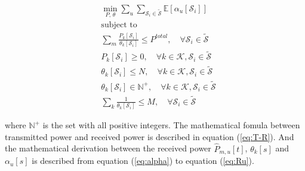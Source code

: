 
\begin{subequations} \label{eq:main}
\begin{align}
    &\min_{P,\,\theta} \sum_{u} \sum_{\mathcal{S}_i\in \mathcal{\widetilde{S}}} \mathbb{E}[\alpha_u[\mathcal{S}_i]] \\ 
    &\text{subject to} \nonumber \\
    &\sum_{m} \frac{P_{k}[\mathcal{S}_i]}{\theta_k[\mathcal{S}_i]} \leq P^{total}, \quad \forall \mathcal{S}_i \in \mathcal{\widetilde{S}} \label{eq:power_constraint} \\ 
    &P_k[\mathcal{S}_i]\geq 0, \quad \forall k\in\mathcal{K}, \mathcal{S}_i\in\mathcal{\widetilde{S}} \label{eq:power_nonnegative} \\
    &\theta_k[\mathcal{S}_i] \leq N, \quad \forall k\in\mathcal{K}, \mathcal{S}_i\in\mathcal{\widetilde{S}} \label{eq:theta_upper} \\
    &\theta_k[\mathcal{S}_i] \in \mathbb{N}^+, \quad \forall k\in\mathcal{K}, \mathcal{S}_i\in\mathcal{\widetilde{S}} \label{eq:theta_positive} \\
    &\sum_k \frac{1}{\theta_k[\mathcal{S}_i]} \leq M, \quad \forall \mathcal{S}_i\in\mathcal{\widetilde{S}} \label{eq:sum_constraint}
\end{align}
\end{subequations}

where $\mathbb{N}^+$ is the set with all positive integers. The mathematical fomula between transmitted power and received power is described in equation (\ref{eq:T-R}). And the mathematical derivation between the received power $\hat{P}_{m, u}[t]$, $\theta_k[s]$ and $\alpha_u[s]$ is described from equation (\ref{eq:alpha}) to equation (\ref{eq:Ru}). 

